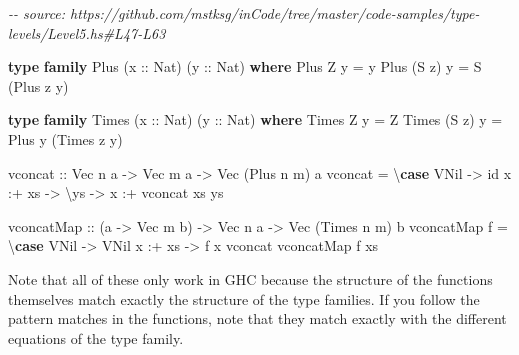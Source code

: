 \documentclass[]{article}
\newenvironment{Shaded}{}{}
\newcommand{\CommentTok}[1]{\textcolor[rgb]{0.38,0.63,0.69}{\textit{#1}}}
\newcommand{\DataTypeTok}[1]{\textcolor[rgb]{0.56,0.13,0.00}{#1}}
\newcommand{\FunctionTok}[1]{\textcolor[rgb]{0.02,0.16,0.49}{#1}}
\newcommand{\KeywordTok}[1]{\textcolor[rgb]{0.00,0.44,0.13}{\textbf{#1}}}
\newcommand{\NormalTok}[1]{#1}
\newcommand{\OperatorTok}[1]{\textcolor[rgb]{0.40,0.40,0.40}{#1}}
\newcommand{\OtherTok}[1]{\textcolor[rgb]{0.00,0.44,0.13}{#1}}
\begin{document}
\begin{Shaded}
\begin{Highlighting}[]
\CommentTok{{-}{-} source: https://github.com/mstksg/inCode/tree/master/code{-}samples/type{-}levels/Level5.hs\#L47{-}L63}

\KeywordTok{type} \KeywordTok{family} \DataTypeTok{Plus}\NormalTok{ (}\OtherTok{x ::} \DataTypeTok{Nat}\NormalTok{) (}\OtherTok{y ::} \DataTypeTok{Nat}\NormalTok{) }\KeywordTok{where}
  \DataTypeTok{Plus} \DataTypeTok{Z}\NormalTok{ y }\OtherTok{=}\NormalTok{ y}
  \DataTypeTok{Plus}\NormalTok{ (}\DataTypeTok{S}\NormalTok{ z) y }\OtherTok{=} \DataTypeTok{S}\NormalTok{ (}\DataTypeTok{Plus}\NormalTok{ z y)}

\KeywordTok{type} \KeywordTok{family} \DataTypeTok{Times}\NormalTok{ (}\OtherTok{x ::} \DataTypeTok{Nat}\NormalTok{) (}\OtherTok{y ::} \DataTypeTok{Nat}\NormalTok{) }\KeywordTok{where}
  \DataTypeTok{Times} \DataTypeTok{Z}\NormalTok{ y }\OtherTok{=} \DataTypeTok{Z}
  \DataTypeTok{Times}\NormalTok{ (}\DataTypeTok{S}\NormalTok{ z) y }\OtherTok{=} \DataTypeTok{Plus}\NormalTok{ y (}\DataTypeTok{Times}\NormalTok{ z y)}

\OtherTok{vconcat ::} \DataTypeTok{Vec}\NormalTok{ n a }\OtherTok{{-}\textgreater{}} \DataTypeTok{Vec}\NormalTok{ m a }\OtherTok{{-}\textgreater{}} \DataTypeTok{Vec}\NormalTok{ (}\DataTypeTok{Plus}\NormalTok{ n m) a}
\NormalTok{vconcat }\OtherTok{=}\NormalTok{ \textbackslash{}}\KeywordTok{case}
  \DataTypeTok{VNil} \OtherTok{{-}\textgreater{}} \FunctionTok{id}
\NormalTok{  x }\OperatorTok{:+}\NormalTok{ xs }\OtherTok{{-}\textgreater{}}\NormalTok{ \textbackslash{}ys }\OtherTok{{-}\textgreater{}}\NormalTok{ x }\OperatorTok{:+}\NormalTok{ vconcat xs ys}

\OtherTok{vconcatMap ::}\NormalTok{ (a }\OtherTok{{-}\textgreater{}} \DataTypeTok{Vec}\NormalTok{ m b) }\OtherTok{{-}\textgreater{}} \DataTypeTok{Vec}\NormalTok{ n a }\OtherTok{{-}\textgreater{}} \DataTypeTok{Vec}\NormalTok{ (}\DataTypeTok{Times}\NormalTok{ n m) b}
\NormalTok{vconcatMap f }\OtherTok{=}\NormalTok{ \textbackslash{}}\KeywordTok{case}
  \DataTypeTok{VNil} \OtherTok{{-}\textgreater{}} \DataTypeTok{VNil}
\NormalTok{  x }\OperatorTok{:+}\NormalTok{ xs }\OtherTok{{-}\textgreater{}}\NormalTok{ f x }\OtherTok{\textasciigrave{}vconcat\textasciigrave{}}\NormalTok{ vconcatMap f xs}
\end{Highlighting}
\end{Shaded}

Note that all of these only work in GHC because the structure of the functions
themselves match exactly the structure of the type families. If you follow the
pattern matches in the functions, note that they match exactly with the
different equations of the type family.
\end{document}
